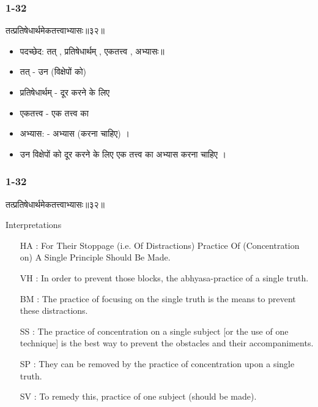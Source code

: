 \begin{frame}[fragile]\frametitle{1-32}
\begin{sanskrit}
तत्प्रतिषेधार्थमेकतत्त्वाभ्यासः॥३२॥
\end{sanskrit}

	\begin{itemize}
	\item पदच्छेद: तत् , प्रतिषेधार्थम् , एकतत्त्व , अभ्यासः॥
	\item तत् - उन (विक्षेपों को)
	\item प्रतिषेधार्थम् - दूर करने के लिए
	\item एकतत्त्व - एक तत्त्व का
	\item अभ्यास: - अभ्यास (करना चाहिए) ।
	\item उन विक्षेपों को दूर करने के लिए एक तत्त्व का अभ्यास करना चाहिए ।
	\end{itemize}

\end{frame}

\begin{frame}[fragile]\frametitle{1-32}
\begin{sanskrit}
तत्प्रतिषेधार्थमेकतत्त्वाभ्यासः॥३२॥
\end{sanskrit}

Interpretations
\begin{itemize}	
\item [HA]: For Their Stoppage (i.e. Of Distractions) Practice Of (Concentration on) A Single Principle Should Be Made.
\item [VH]: In order to prevent those blocks, the abhyasa-practice of a single truth.
\item [BM]: The practice of focusing on the single truth is the means to prevent these distractions.
\item [SS]: The practice of concentration on a single subject [or the use of one technique] is the best way to prevent the obstacles and their accompaniments.
\item [SP]: They can be removed by the practice of concentration upon a single truth.
\item [SV]: To remedy this, practice of one subject (should be made). 
\end{itemize}

\end{frame}


